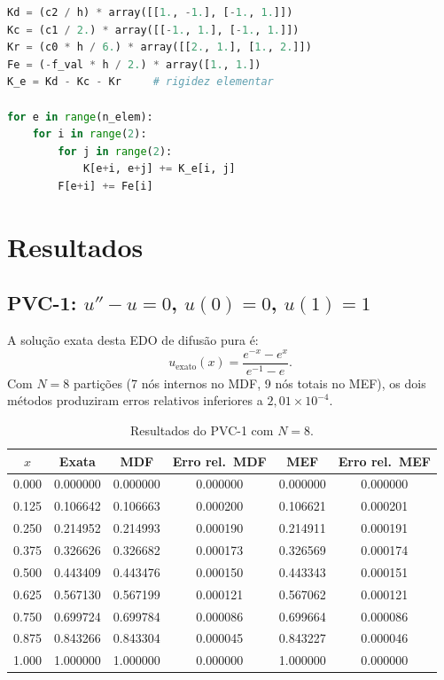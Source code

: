 \documentclass[12pt,a4paper]{article}
\begin{document}
\begin{lstlisting}[language=Python, caption={Montagem da rigidez local e global do MEF 1D.}]
Kd = (c2 / h) * array([[1., -1.], [-1., 1.]])
Kc = (c1 / 2.) * array([[-1., 1.], [-1., 1.]])
Kr = (c0 * h / 6.) * array([[2., 1.], [1., 2.]])
Fe = (-f_val * h / 2.) * array([1., 1.])
K_e = Kd - Kc - Kr     # rigidez elementar

for e in range(n_elem):
    for i in range(2):
        for j in range(2):
            K[e+i, e+j] += K_e[i, j]
        F[e+i] += Fe[i]
\end{lstlisting}

\section{Resultados}

\subsection{PVC-1: $u'' - u = 0$, $u(0)=0$, $u(1)=1$}
A solução exata desta EDO de difusão pura é:
\begin{equation}
    u_{\text{exato}}(x) = \frac{e^{-x} - e^{x}}{e^{-1} - e}.
\end{equation}
Com $N=8$ partições (7 nós internos no MDF, 9 nós totais no MEF), os dois métodos produziram erros relativos inferiores a $2{,}01\times10^{-4}$.

\begin{table}[H]
\centering
\small
\begin{tabular}{cccccc}
\toprule
$x$ & Exata & MDF & Erro rel.\ MDF & MEF & Erro rel.\ MEF \\
\midrule
0.000 & 0.000000 & 0.000000 & 0.000000 & 0.000000 & 0.000000 \\
0.125 & 0.106642 & 0.106663 & 0.000200 & 0.106621 & 0.000201 \\
0.250 & 0.214952 & 0.214993 & 0.000190 & 0.214911 & 0.000191 \\
0.375 & 0.326626 & 0.326682 & 0.000173 & 0.326569 & 0.000174 \\
0.500 & 0.443409 & 0.443476 & 0.000150 & 0.443343 & 0.000151 \\
0.625 & 0.567130 & 0.567199 & 0.000121 & 0.567062 & 0.000121 \\
0.750 & 0.699724 & 0.699784 & 0.000086 & 0.699664 & 0.000086 \\
0.875 & 0.843266 & 0.843304 & 0.000045 & 0.843227 & 0.000046 \\
1.000 & 1.000000 & 1.000000 & 0.000000 & 1.000000 & 0.000000 \\
\bottomrule
\end{tabular}
\caption{Resultados do PVC-1 com $N=8$.}
\end{table}
\end{document}
